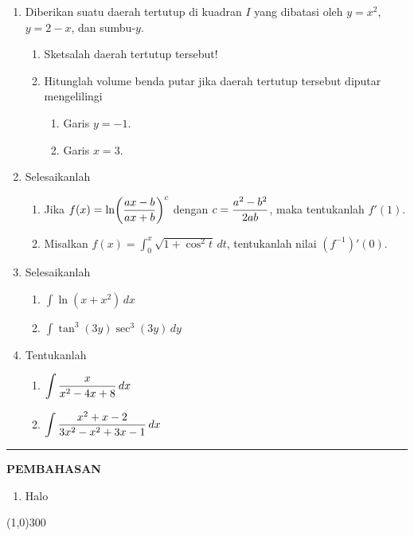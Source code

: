 \begin{enumerate}[leftmargin=*, label={\arabic*}.]
\item Diberikan suatu daerah tertutup di kuadran $I$ yang dibatasi oleh $y=x^{2}$, 
$y=2-x$, dan sumbu-$y$.
\begin{enumerate}[label={\alph*}.]
    \item Sketsalah daerah tertutup tersebut!
    \item Hitunglah volume benda putar jika daerah tertutup tersebut 
    diputar mengelilingi
    \begin{enumerate}[label={\roman*}.]
        \item Garis $y=-1$.
        \item Garis $x=3$.
    \end{enumerate}
\end{enumerate}
\item Selesaikanlah
\begin{enumerate}[label={\alph*}.]
    \item Jika $\ds f(x) = \ln\brk*{\frac{ax-b}{ax+b}}^{c}$ dengan 
    $\displaystyle c=\frac{a^{2}-b^{2}}{2ab}$, maka tentukanlah $f'(1)$.
    \item Misalkan $f(x)=\int_0^{x}\sqrt{1+\cos^{2}t}\,dt$, tentukanlah 
    nilai $(f^{-1})'(0)$.
\end{enumerate}
\item Selesaikanlah
\begin{enumerate}[label={\alph*}.]
    \item $\int \ln (x+x^{2})\,dx$
    \item $\int \tan^{3}(3y)\sec^{3}(3y)\,dy$
\end{enumerate}
\item Tentukanlah
\begin{enumerate}[label={\alph*}.]
    \item $\displaystyle \int \frac{x}{x^{2}-4x+8}\,dx$
    \item $\displaystyle \int \frac{x^{2}+x-2}{3x^{2}-x^{2}+3x-1}\,dx$
\end{enumerate}
\end{enumerate}
\vspace{0.2cm}
\hrule height 1pt
\vspace{0.5cm}
\begin{center}
    \textbf{\large{PEMBAHASAN}}
\end{center}
\begin{enumerate}[leftmargin=*, label={\arabic*}.]
\item Halo
\end{enumerate}

\begin{center}
    \line(1,0){300}
\end{center}
